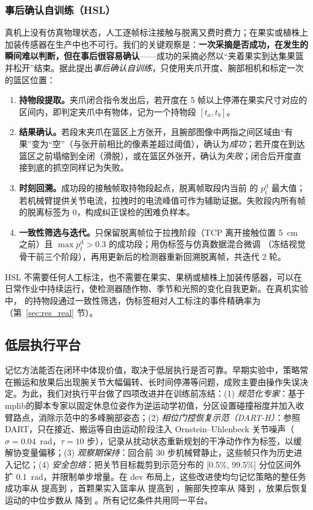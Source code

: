 \subsubsection{事后确认自训练（HSL）}
\label{sec:hsl}
真机上没有仿真物理状态，人工逐帧标注接触与脱离又费时费力；在果实或植株上加装传感器在生产中也不可行。我们的关键观察是：\textbf{一次采摘是否成功，在发生的瞬间难以判断，但在事后很容易确认}——成功的采摘必然以“夹着果实到达集果篮并松开”结束。据此提出\emph{事后确认自训练}，只使用夹爪开度、腕部相机和标定一次的篮区位置：
\begin{enumerate}
\item \textbf{持物段提取。}夹爪闭合指令发出后，若开度在 5 帧以上停滞在果实尺寸对应的区间内，即判定夹爪中有物体，记为一个持物段 $[t_a,t_b]$。
\item \textbf{结果确认。}若段末夹爪在篮区上方张开，且腕部图像中两指之间区域由“有果”变为“空”（与张开前相比的像素差超过阈值），确认为\emph{成功}；若开度在到达篮区之前塌缩到全闭（滑脱），或在篮区外张开，确认为\emph{失败}；闭合后开度直接到底的抓空同样记为失败。
\item \textbf{时刻回溯。}成功段的接触帧取持物段起点，脱离帧取段内当前 \pedet{} 的 $p^{\mathrm d}_t$ 最大值；若机械臂提供关节电流，拉拽时的电流峰值可作为辅助证据。失败段内所有帧的脱离标签为 0，构成纠正误检的困难负样本。
\item \textbf{一致性筛选与迭代。}只保留脱离帧位于拉拽阶段（TCP 离开接触位置 5~cm 之前）且 $\max p^{\mathrm d}_t>0.3$ 的成功段；用伪标签与仿真数据混合微调 \pedet{}（冻结视觉骨干前三个阶段），再用更新后的检测器重新回溯脱离帧，共迭代 2 轮。
\end{enumerate}
HSL 不需要任何人工标注，也不需要在果实、果柄或植株上加装传感器，可以在日常作业中持续运行，使检测器随作物、季节和光照的变化自我更新。在真机实验中， 的持物段通过一致性筛选，伪标签相对人工标注的事件精确率为 （第~\ref{sec:res_real} 节）。

\subsection{低层执行平台}
\label{sec:platform}
\label{sec:dart}
记忆方法能否在闭环中体现价值，取决于低层执行是否可靠。早期实验中，策略常在搬运和放果后出现腕关节大幅偏转、长时间停滞等问题，成败主要由操作失误决定。为此，我们对执行平台做了四项改进并在训练前冻结：(1) \emph{规范化专家}：基于 mplib\cite{mplib}的脚本专家以固定休息位姿作为逆运动学初值，分区设置碰撞裕度并加入收臂路点，消除示范中的多峰腕部姿态；(2) \emph{相位门控恢复示范（DART-H）}：参照 DART\cite{laskey2017dart}，只在接近、搬运等自由运动阶段注入 Ornstein--Uhlenbeck 关节噪声（$\sigma=0.04$~rad，$\tau=10$ 步），记录从扰动状态重新规划的干净动作作为标签，以缓解协变量偏移\cite{ross2011dagger}；(3) \emph{观察期保持}：回合前 30 步机械臂静止，这些帧只作为历史进入记忆；(4) \emph{安全包络}：把关节目标裁剪到示范分布的 [0.5\%, 99.5\%] 分位区间外扩 0.1~rad，并限制单步增量。在 dev 布局上，这些改进使均匀记忆策略的整任务成功率从  提高到 ，首颗果实入篮率从  提高到 ，腕部失控率从  降到 ，放果后恢复运动的中位步数从  降到 。所有记忆条件共用同一平台。

